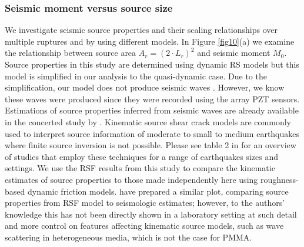 \documentclass[draft]{agujournal2019}
\begin{document}

\subsubsection{Seismic moment versus source size}

We investigate seismic source properties and their scaling relationships over multiple ruptures and by using different models. In Figure \ref{fig10}(a) we examine the relationship between source area $A_{r} = (2\cdot L_{r})^{2}$ and seismic moment $M_{0}$. Source properties in this study are determined using dynamic RS models but this model is simplified in our analysis to the quasi-dynamic case. Due to the simplification, our model does not produce seismic waves \cite{Freund1990, Rosakis2002}. However, we know these waves were produced since they were recorded using the array PZT sensors. Estimations of source properties inferred from seismic waves are already available in the concerted study by .  Kinematic source shear crack models \cite{Brune1970, Madariaga1976, Hanks1979} are commonly used to interpret source information of moderate to small to medium earthquakes where finite source inversion is not possible. Please see table 2 in  for an overview of studies that employ these techniques for a range of earthquakes sizes and settings. We use the RSF results from this study to compare the kinematic estimates of source properties to those made independently here using roughness-based dynamic friction models.  have prepared a similar plot, comparing source properties from RSF model to seismologic estimates; however, to the authors' knowledge this has not been directly shown in a laboratory setting at such detail and more control on features affecting kinematic source models, such as wave scattering in heterogeneous media, which is not the case for PMMA.
\end{document}
